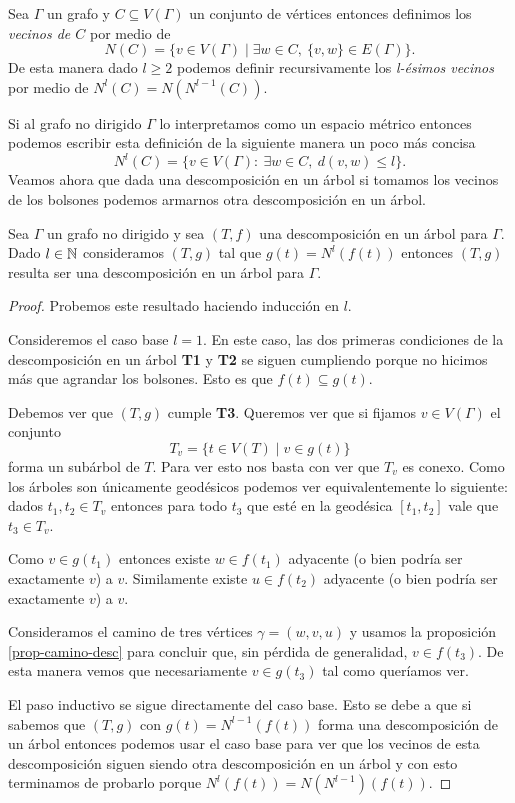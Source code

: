 \documentclass[tesis.tex]{subfiles}
\begin{document}
\begin{deff}
	Sea $\Gamma$ un grafo y $C \subseteq V(\Gamma)$ un conjunto de vértices entonces definimos los \emph{vecinos de $C$} por medio de 
	\[
	N(C) = \{ v \in V(\Gamma) \mid \exists w \in C, \ \{v,w \} \in E(\Gamma) \}.
	\]
	De esta manera dado $l \ge 2$ podemos definir recursivamente los \emph{l-ésimos vecinos} por medio de $N^l(C) = N(N^{l-1}(C))$.
\end{deff}


	Si al grafo no dirigido $\Gamma$ lo interpretamos como un espacio métrico entonces podemos escribir esta definición de la siguiente manera un poco más concisa
	\[
		N^l (C) = \{ v \in V(\Gamma) : \ \exists w \in C, \  d(v,w) \le l  \}.
	\]
	Veamos ahora que dada una descomposición en un árbol si tomamos los vecinos de los bolsones podemos armarnos otra descomposición en un árbol.


\begin{prop}\label{prop-vecinos-desc}
	Sea $\Gamma$ un grafo no dirigido y sea $(T,f)$ una descomposición en un árbol para $\Gamma$.
	Dado $l \in \mathbb{N}$ consideramos $(T,g)$ tal que $g(t) = N^l(f(t))$ entonces $(T,g)$ resulta ser una descomposición en un árbol para $\Gamma$.
\end{prop}
\begin{proof}
	Probemos este resultado haciendo inducción en $l$.
	
	Consideremos el caso base $l=1$.
	En este caso, las dos primeras condiciones de la descomposición en un árbol \textbf{T1} y \textbf{T2} se siguen cumpliendo porque no hicimos más que agrandar los bolsones. 
	Esto es que $f(t) \subseteq g(t)$.
	
	Debemos ver que $(T,g)$ cumple \textbf{T3}.
	Queremos ver que si fijamos $v \in V(\Gamma)$ el conjunto 
	\[
		T_{v} = \{ t \in V(T) \mid v \in g(t)  \}
	\]
	forma un subárbol de $T$. 
	Para ver esto nos basta con ver que $T_{v}$ es conexo.
	Como los árboles son únicamente geodésicos podemos ver equivalentemente lo siguiente:
	dados $t_{1}, t_{2} \in T_{v}$ entonces para todo $t_{3}$ que esté en la geodésica $[t_{1}, t_{2}]$ vale que $t_{3} \in T_{v}$. 
	
	Como $v \in g(t_{1})$ entonces existe $w \in f(t_{1})$ adyacente (o bien podría ser exactamente $v$) a $v$.
	Similamente existe $u \in f(t_{2})$ adyacente (o bien podría ser exactamente $v$) a $v$.
	
	Consideramos el camino de tres vértices $\gamma = (w,v,u)$ y usamos la proposición \ref{prop-camino-desc} para concluir que, sin pérdida de generalidad, $v \in f(t_{3})$.
	De esta manera vemos que necesariamente $v \in g(t_{3})$ tal como queríamos ver.
		
	El paso inductivo se sigue directamente del caso base.
	Esto se debe a que si sabemos que $(T,g)$ con $g(t) = N^{l-1}(f(t))$ forma una descomposición de un árbol entonces podemos usar el caso base para ver que los vecinos de esta descomposición siguen siendo otra descomposición en un árbol y con esto terminamos de probarlo porque $N^l(f(t)) = N (N^{l-1})(f(t))$.
\end{proof}
\medskip
\end{document}
